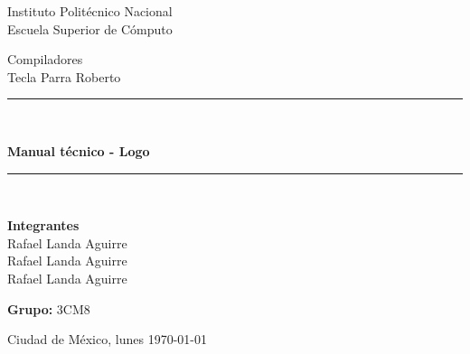 \begin{center}
	\vspace*{0.0in}
	\begin{large}
		Instituto Politécnico Nacional\\                %
		\vspace*{0.2in}
		Escuela Superior de Cómputo\\                   %
		\vspace*{0.6in}
		
	\end{large}
	\begin{large}
		Compiladores \\	                       			%
		\vspace*{0.2in}
		Tecla Parra Roberto\\                 			%
		\vspace*{0.8in}
		
	\end{large}
	\rule{150mm}{0.1mm}\\
	\vspace*{0.2in}
	\begin{Large}
		\textbf{Manual técnico - Logo} \\     			%
        \vspace*{0.2in}
        
	\end{Large}
	\vspace*{0.2in}
	\rule{150mm}{0.1mm}\\
	\begin{large}
		\vspace*{0.3in}
		
		\textbf{Integrantes} \\
		Rafael Landa Aguirre\\
		Rafael Landa Aguirre\\
		Rafael Landa Aguirre\\
	\end{large}
	\begin{large}
		\vspace*{0.35in}
		\textbf{Grupo:} 3CM8 \\
		\vspace*{0.4in}
		
		Ciudad de México, lunes \today\\     			%
	\end{large}
\end{center}
